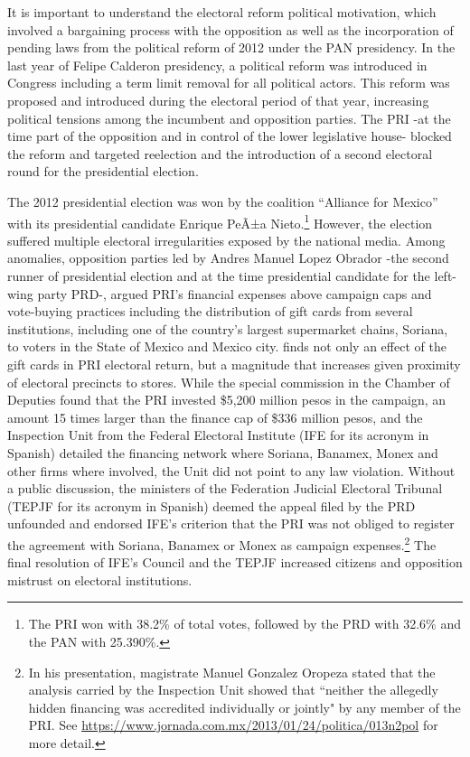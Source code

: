 \documentclass[12pt]{amsart}
\makeatletter
\def\section{\@startsection{section}{1}
	\z@{1.0\linespacing\@plus\linespacing}{.5\linespacing}{\Large}}
\numberwithin{equation}{section}
\theoremstyle{definition}
\theoremstyle{definition}
\theoremstyle{definition}
\makeatother
\begin{document}
\begin{appendix}
\section{Political Background of the 2014 Electoral Reform}\label{appendix:reform_backgorund}


It is important to understand the electoral reform political motivation, which involved a bargaining process with the opposition as well as the incorporation of pending laws from the political reform of 2012 under the PAN presidency. In the last year of Felipe Calderon presidency, a political reform was introduced in Congress including a term limit removal for all political actors. This reform was proposed and introduced during the electoral period of that year, increasing political tensions among the incumbent and opposition parties. The PRI -at the time part of the opposition and in control of the lower legislative house- blocked the reform and targeted reelection and the introduction of a second electoral round for the presidential election. 
 
  The 2012 presidential election was won by the coalition ``Alliance for Mexico'' with its presidential candidate Enrique PeÃ±a Nieto.\footnote{The PRI won with 38.2\% of total votes, followed by the PRD with 32.6\% and the PAN with 25.390\%.} However, the election suffered multiple electoral irregularities exposed by the national media. Among anomalies, opposition parties led by Andres Manuel Lopez Obrador -the second runner of presidential election and at the time presidential candidate for the left-wing party PRD-, argued PRI's financial expenses above campaign caps and vote-buying practices including the distribution of gift cards from several institutions, including one of the country's largest supermarket chains, Soriana, to voters in the State of Mexico and Mexico city. \citet{cantu_2019} finds not only an effect of the gift cards in PRI electoral return, but a magnitude that increases given proximity of electoral precincts to stores. While the special commission in the Chamber of Deputies found that the PRI invested \$5,200 million pesos in the campaign, an amount 15 times larger than the finance cap of \$336 million pesos, and the Inspection Unit from the Federal Electoral Institute (IFE for its acronym in Spanish) detailed the financing network where Soriana, Banamex, Monex and other firms where involved, the Unit did not point to any law violation. Without a public discussion, the ministers of the Federation Judicial Electoral Tribunal (TEPJF for its acronym in Spanish) deemed the appeal filed by the PRD unfounded and endorsed IFE's  criterion that the PRI was not obliged to register the agreement with Soriana, Banamex or Monex as campaign expenses.\footnote{In his presentation, magistrate Manuel Gonzalez Oropeza stated that the analysis carried by the Inspection Unit showed that ``neither the allegedly hidden financing was accredited individually or jointly" by any member of the PRI. See \url{https://www.jornada.com.mx/2013/01/24/politica/013n2pol} for more detail.} The final resolution of IFE's Council and the TEPJF increased citizens and opposition mistrust on electoral institutions. 


\end{appendix}
\end{document}
